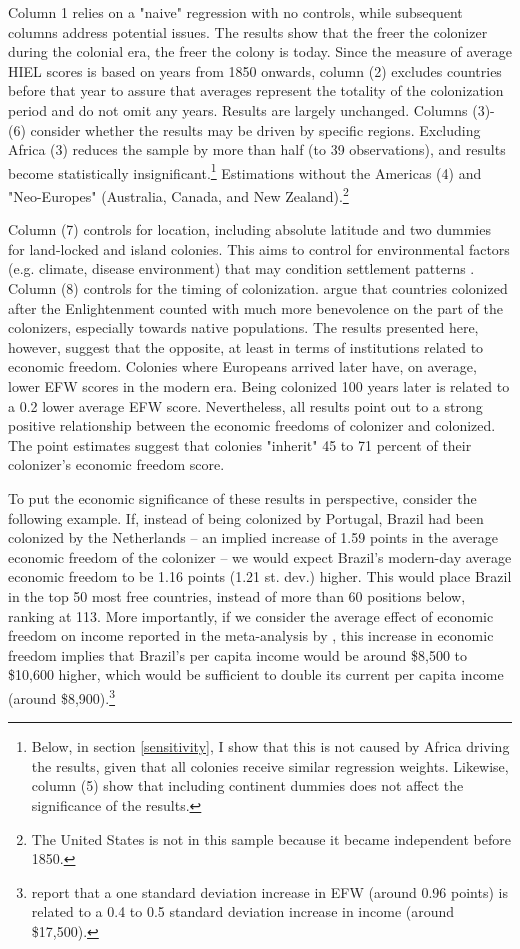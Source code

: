 \documentclass[a4paper,12pt]{article}
\begin{document}
Column 1 relies on a "naive" regression with no controls, while subsequent columns address potential issues. The results show that the freer the colonizer during the colonial era, the freer the colony is today. Since the measure of average HIEL scores is based on years from 1850 onwards, column (2) excludes countries before that year to assure that averages represent the totality of the colonization period and do not omit any years. Results are largely unchanged. Columns (3)-(6) consider whether the results may be driven by specific regions. Excluding Africa (3) reduces the sample by more than half (to 39 observations), and results become statistically insignificant.\footnote{Below, in section \ref{sensitivity}, I show that this is not caused by Africa driving the results, given that all colonies receive similar regression weights. Likewise, column (5) show that including continent dummies does not affect the significance of the results.}  Estimations without the Americas (4) and "Neo-Europes" (Australia, Canada, and New Zealand).\footnote{The United States is not in this sample because it became independent before 1850.} 

Column (7) controls for location, including absolute latitude and two dummies for land-locked and island colonies. This aims to control for environmental factors (e.g. climate, disease environment) that may condition settlement patterns \citep[e.g.][]{Acemoglu2001,Sachs2003,engermansokoloff1997}. Column (8) controls for the timing of colonization. \cite{feyrer2009colonialism} argue that countries colonized after the Enlightenment counted with much more benevolence on the part of the colonizers, especially towards native populations. The results presented here, however, suggest that the opposite, at least in terms of institutions related to economic freedom. Colonies where Europeans arrived later have, on average, lower EFW scores in the modern era. Being colonized 100 years later is related to a 0.2 lower average EFW score. Nevertheless, all results point out to a strong positive relationship between the economic freedoms of colonizer and colonized. The point estimates suggest that colonies "inherit" 45 to 71 percent of their colonizer's economic freedom score. 

To put the economic significance of these results in perspective, consider the following example. If, instead of being colonized by Portugal, Brazil had been colonized by the Netherlands -- an implied increase of 1.59 points in the average economic freedom of the colonizer -- we would expect Brazil's modern-day average economic freedom to be 1.16 points (1.21 st. dev.) higher. This would place Brazil in the top 50 most free countries, instead of more than 60 positions below, ranking at 113. More importantly, if we consider the average effect of economic freedom on income reported in the meta-analysis by \cite{lawson2024economic}, this increase in economic freedom implies that Brazil's per capita income would be around \$8,500 to \$10,600 higher, which would be sufficient to double its current per capita income (around \$8,900).\footnote{\cite{lawson2024economic} report that a one standard deviation increase in EFW (around 0.96 points) is related to a 0.4 to 0.5 standard deviation increase in income (around \$17,500).}
\end{document}

